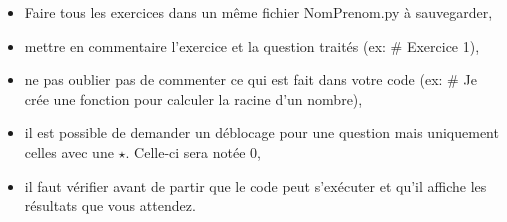 




\usepackage{variations} 





\begin{center}
{\Large\bf {\type} \no {\numero}}
\end{center}


\begin{boxedminipage}{.9\textwidth} 
\begin{itemize}
 \item Faire tous les exercices dans un même fichier {NomPrenom.py} à sauvegarder,
 \item mettre en commentaire l'exercice et la question traités (ex: \# Exercice 1),
 \item ne pas oublier pas de commenter ce qui est fait dans votre code (ex: \# Je crée une fonction pour calculer la racine d'un nombre),
 \item il est possible de demander un déblocage pour une question mais uniquement celles avec une $\star$. Celle-ci sera notée 0,
 \item il faut vérifier avant de partir que le code peut s'exécuter et qu'il affiche les résultats que vous attendez.
\end{itemize}
\end{boxedminipage}





